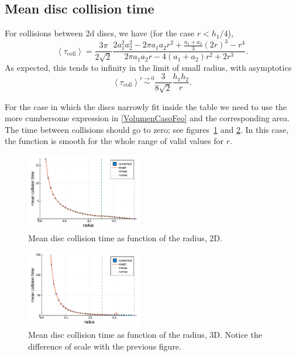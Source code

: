 \documentclass[superscriptaddress,pre,reprint,showpacs,twocolumn]{revtex4-1}
\newcommand{\mean}[1]{\left \langle #1 \right \rangle}
\begin{document}
\subsection{Mean disc collision time}

For collisions between 2d discs, we have (for the case $r < h_1/4$),
\begin{equation}\label{colltau}
 \mean{\tau_\text{coll}} = 	
\frac{3 \pi}{2\sqrt{2}}
\frac {2 a_1^2 a_2^2  - 2 \pi a_1 a_2 r^{2} + \textstyle \frac{a_1+a_2}{3}  (2r)^{3}
  -  r^4}
{2\pi a_1 a_2 r -4(a_1+a_2)r^2+2r^3}.
\end{equation}
As expected, this tends to infinity in the limit of small radius, with asymptotics
\begin{equation}\label{colltaulim0}
\mean{\tau_\text{coll}} \overset{r \to 0}{\sim}
\frac{3}{8\sqrt{2}}\frac{h_1h_2}{r}.
\end{equation}

For the case in which the discs narrowly fit inside the table we need to
use the more cumbersome expression in \eqref{VolumenCasoFeo} and
the corresponding area. The time between collisions should go to zero; 
see figures~\ref{meancol2d}  and \ref{meancol3d}.
In this case, the function is smooth for the whole
range of valid values for $r$.

\begin{figure}[h]
  \centering
  \includegraphics[width=0.45\textwidth]{figures/collisions2d.pdf}
  \caption{Mean disc collision time as function of the radius, 2D. }\label{meancol2d}
\end{figure}


\begin{figure}[h]
  \centering
  \includegraphics[width=0.45\textwidth]{figures/collisions3d.pdf}
  \caption{Mean disc collision time as function of the radius, 3D.
  Notice the difference of scale with the previous figure.}\label{meancol3d}
\end{figure}
\end{document}
